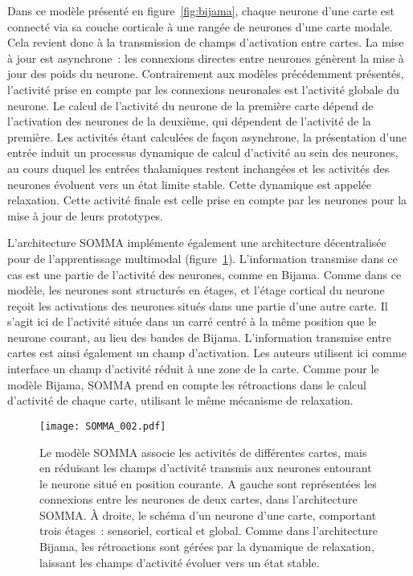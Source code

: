 \documentclass[../main]{subfiles}
\begin{document}
Dans ce modèle présenté en figure~\ref{fig:bijama}, chaque neurone d'une carte est connecté via sa couche corticale à une rangée de neurones d'une carte modale. Cela revient donc à la transmission de champs d'activation entre cartes.
La mise à jour est asynchrone~: les connexions directes entre neurones génèrent la mise à jour des poids du neurone. Contrairement aux modèles précédemment présentés, l'activité prise en compte par les connexions neuronales est l'activité globale du neurone. Le calcul de l'activité du neurone de la première carte dépend de l'activation des neurones de la deuxième, qui dépendent de l'activité de la première.
Les activités étant calculées de façon asynchrone, la présentation d'une entrée induit un processus dynamique de calcul d'activité au sein des neurones, au cours duquel les entrées thalamiques restent inchangées et les activités des neurones évoluent vers un état limite stable. 
Cette dynamique est appelée relaxation.
Cette activité finale est celle prise en compte par les neurones pour la mise à jour de leurs prototypes.

L'architecture SOMMA implémente également une architecture décentralisée pour de l'apprentissage multimodal (figure~\ref{fig:somma}).
L'information transmise dans ce cas est une partie de l'activité des neurones, comme en Bijama. Comme dans ce modèle, les neurones sont structurés en étages, et l'étage cortical du neurone reçoit les activations des neurones situés dans une partie d'une autre carte.
Il s'agit ici de l'activité située dans un carré centré à la même position que le neurone courant, au lieu des bandes de Bijama.
L'information transmise entre cartes est ainsi également un champ d'activation. Les auteurs utilisent ici comme interface un champ d'activité réduit à une zone de la carte. Comme pour le modèle Bijama, SOMMA prend en compte les rétroactions dans le calcul d'activité de chaque carte, utilisant le même mécanisme de relaxation.


\begin{figure}
    \centering\texttt{[image: SOMMA\_002.pdf]}
    \caption{
        Le modèle SOMMA \parencite{lefort_unlearning_2011,lefort_apprentissage_2012} associe les activités de différentes cartes, mais en réduisant les champs d'activité transmis aux neurones entourant le neurone situé en position courante. A gauche sont représentées les connexions entre les neurones de deux cartes, dans l'architecture SOMMA. \`A droite, le schéma d'un neurone d'une carte, comportant trois étages~: sensoriel, cortical et global.
        Comme dans l'architecture Bijama, les rétroactions sont gérées par la dynamique de relaxation, laissant les champs d'activité évoluer vers un état stable.
    \label{fig:somma}}
\end{figure}
\end{document}
